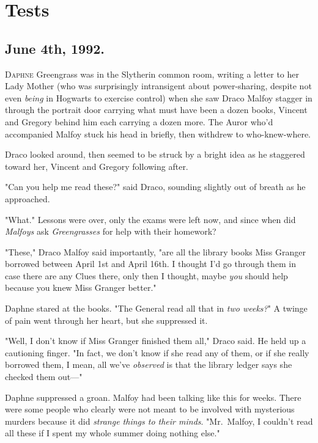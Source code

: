 \chapter{Tests}

\section{June 4th, 1992.}

\lettrine{D}{aphne} Greengrass was in the Slytherin common room, writing a letter to her
Lady Mother (who was surprisingly intransigent about power-sharing, despite not
even \emph{being} in Hogwarts to exercise control) when she saw Draco Malfoy
stagger in through the portrait door carrying what must have been a dozen
books, Vincent and Gregory behind him each carrying a dozen more. The Auror
who'd accompanied Malfoy stuck his head in briefly, then withdrew to
who-knew-where.

Draco looked around, then seemed to be struck by a bright idea as he staggered
toward her, Vincent and Gregory following after.

"Can you help me read these?" said Draco, sounding slightly out of breath as he
approached.

"What." Lessons were over, only the exams were left now, and since when
did \emph{Malfoys} ask \emph{Greengrasses} for help with their homework?

"These," Draco Malfoy said importantly, "are all the library books Miss Granger
borrowed between April 1st and April 16th. I thought I'd go through them in
case there are any Clues there, only then I thought, maybe \emph{you} should
help because you knew Miss Granger better."

Daphne stared at the books. "The General read all that in \emph{two weeks?}" A
twinge of pain went through her heart, but she suppressed it.

"Well, I don't know if Miss Granger finished them all," Draco said. He held up
a cautioning finger. "In fact, we don't know if she read any of them, or if she
really borrowed them, I mean, all we've \emph{observed} is that the library
ledger says she checked them out---"

Daphne suppressed a groan. Malfoy had been talking like this for weeks. There
were some people who clearly were not meant to be involved with mysterious
murders because it did \emph{strange things to their minds}. "Mr.~Malfoy, I
couldn't read all these if I spent my whole summer doing nothing else."

